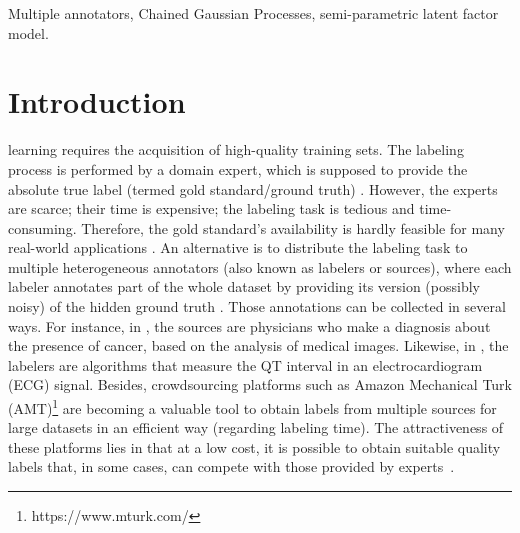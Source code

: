 \documentclass[journal]{IEEEtran}
\begin{document}
\begin{IEEEkeywords}
Multiple annotators, Chained Gaussian Processes, semi-parametric latent factor model.
\end{IEEEkeywords}

%
\IEEEpeerreviewmaketitle



\section{Introduction}

 learning requires the acquisition of high-quality training sets. The labeling process is performed by a domain expert, which is supposed to provide the absolute true label (termed gold standard/ground truth) \citep{zhang2019crowdsourced}. However, the experts are scarce; their time is expensive; the labeling task is tedious and time-consuming. Therefore, the gold standard's availability is hardly feasible for many real-world applications \citep{liu2020truth}. An alternative is to distribute the labeling task to multiple heterogeneous annotators (also known as labelers or sources), where each labeler annotates part of the whole dataset by providing its version (possibly noisy) of the hidden ground truth \cite{kara2015modeling}. Those annotations can be collected in several ways. For instance, in \cite{raykar2010learning}, the sources are physicians who make a diagnosis about the presence of cancer, based on the analysis of medical images. Likewise, in \cite{zhu2019unsupervised}, the labelers are algorithms that measure the QT interval in an electrocardiogram (ECG) signal. Besides, crowdsourcing platforms such as Amazon Mechanical Turk (AMT)\footnote{https://www.mturk.com/} are becoming a valuable tool to obtain labels from multiple sources for large datasets in an efficient way (regarding labeling time). The attractiveness of these platforms lies in that at a low cost, it is possible to obtain suitable quality labels that, in some cases, can compete with those provided by experts~\cite{snow2008cheap}. 
\end{document}
